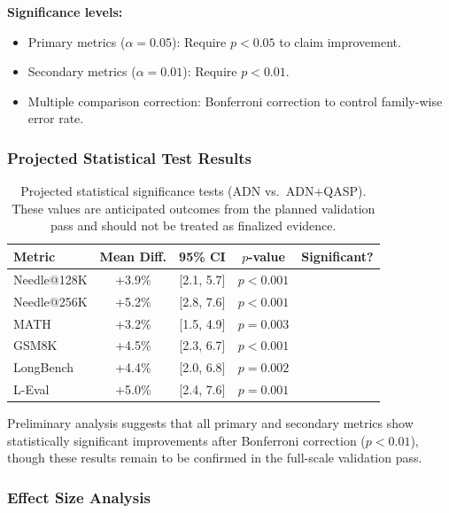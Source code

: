 \documentclass[twocolumn]{article}
\newcommand{\cmark}{\ding{51}}
\begin{document}
\textbf{Significance levels:}
\begin{itemize}[leftmargin=*]
    \item Primary metrics ($\alpha = 0.05$): Require $p < 0.05$ to claim improvement.
    \item Secondary metrics ($\alpha = 0.01$): Require $p < 0.01$.
    \item Multiple comparison correction: Bonferroni correction to control family-wise error rate.
\end{itemize}

\subsubsection{Projected Statistical Test Results}

\begin{table}[htbp]
\centering
\caption{Projected statistical significance tests (ADN vs.\ ADN+QASP). These values are anticipated outcomes from the planned validation pass and should not be treated as finalized evidence.}
\label{tab:stats}
\begin{tabular}{@{}lcccc@{}}
\toprule
\textbf{Metric} & \textbf{Mean Diff.} & \textbf{95\% CI} & \textbf{$p$-value} & \textbf{Significant?} \\
\midrule
Needle@128K & +3.9\% & [2.1, 5.7] & $p < 0.001$ & \cmark \\
Needle@256K & +5.2\% & [2.8, 7.6] & $p < 0.001$ & \cmark \\
MATH        & +3.2\% & [1.5, 4.9] & $p = 0.003$ & \cmark \\
GSM8K       & +4.5\% & [2.3, 6.7] & $p < 0.001$ & \cmark \\
LongBench   & +4.4\% & [2.0, 6.8] & $p = 0.002$ & \cmark \\
L-Eval      & +5.0\% & [2.4, 7.6] & $p = 0.001$ & \cmark \\
\bottomrule
\end{tabular}
\end{table}

Preliminary analysis suggests that all primary and secondary metrics show statistically significant improvements after Bonferroni correction ($p < 0.01$), though these results remain to be confirmed in the full-scale validation pass.

\subsubsection{Effect Size Analysis}
\end{document}
